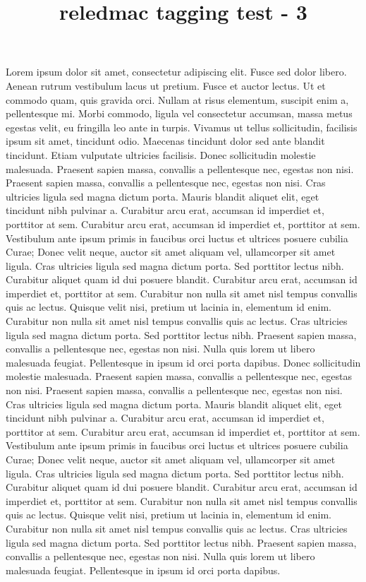\documentclass{article}
\title{reledmac tagging test - 3}
\begin{document}
\beginnumbering
\pstart
Lorem ipsum dolor sit amet, consectetur adipiscing elit. Fusce sed dolor libero. Aenean rutrum vestibulum lacus ut pretium. Fusce et auctor lectus. Ut et commodo quam, quis gravida orci. Nullam at risus elementum, suscipit enim a, pellentesque mi. Morbi commodo, ligula vel consectetur accumsan, massa metus egestas velit, eu fringilla leo ante in turpis. Vivamus ut tellus sollicitudin, facilisis ipsum sit amet, tincidunt odio. Maecenas tincidunt dolor sed ante blandit tincidunt. Etiam vulputate ultricies facilisis.
Donec sollicitudin molestie malesuada. Praesent sapien massa, convallis a pellentesque nec, egestas non nisi. Praesent sapien massa, convallis a pellentesque nec, egestas non nisi. Cras ultricies ligula sed magna dictum porta. Mauris blandit aliquet elit, eget tincidunt nibh pulvinar a. Curabitur arcu erat, accumsan id imperdiet et, porttitor at sem. Curabitur arcu erat, accumsan id imperdiet et, porttitor at sem. Vestibulum ante ipsum primis in faucibus orci luctus et ultrices posuere cubilia Curae; Donec velit neque, auctor sit amet aliquam vel, ullamcorper sit amet ligula. Cras ultricies ligula sed magna dictum porta. Sed porttitor lectus nibh. Curabitur aliquet quam id dui posuere blandit. Curabitur arcu erat, accumsan id imperdiet et, porttitor at sem. Curabitur non nulla sit amet nisl tempus convallis quis ac lectus. Quisque velit nisi, pretium ut lacinia in, elementum id enim. Curabitur non nulla sit amet nisl tempus convallis quis ac lectus. Cras ultricies ligula sed magna dictum porta. Sed porttitor lectus nibh. Praesent sapien massa, convallis a pellentesque nec, egestas non nisi. Nulla quis lorem ut libero malesuada feugiat. Pellentesque in ipsum id orci porta dapibus.
Donec sollicitudin molestie malesuada. Praesent sapien massa, convallis a pellentesque nec, egestas non nisi. Praesent sapien massa, convallis a pellentesque nec, egestas non nisi. Cras ultricies ligula sed magna dictum porta. Mauris blandit aliquet elit, eget tincidunt nibh pulvinar a. Curabitur arcu erat, accumsan id imperdiet et, porttitor at sem. Curabitur arcu erat, accumsan id imperdiet et, porttitor at sem. Vestibulum ante ipsum primis in faucibus orci luctus et ultrices posuere cubilia Curae;
 Donec velit neque, auctor sit amet aliquam vel, ullamcorper sit amet ligula. Cras ultricies ligula sed magna dictum porta. Sed porttitor lectus nibh. Curabitur aliquet quam id dui posuere blandit. Curabitur arcu erat, accumsan id imperdiet et, porttitor at sem. Curabitur non nulla sit amet nisl tempus convallis quis ac lectus. Quisque velit nisi, pretium ut lacinia in, elementum id enim. Curabitur non nulla sit amet nisl tempus convallis quis ac lectus. Cras ultricies ligula sed magna dictum porta. Sed porttitor lectus nibh. Praesent sapien massa, convallis a pellentesque nec, egestas non nisi. Nulla quis lorem ut libero malesuada feugiat. Pellentesque in ipsum id orci porta dapibus.
\end{document}
